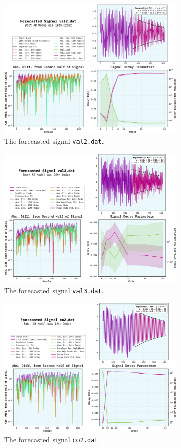 \documentclass[10pt, titlepage, a4paper]{article}
\begin{document}
\begin{figure}[H]
    \centering
    \includegraphics[width=0.8\textwidth]{../LinForecast/Images/forecast-val2.dat.pdf}
    \caption{The forecasted signal \texttt{val2.dat}.}
    \label{fig:forecast-1}
\end{figure}

\begin{figure}[H]
    \centering
    \includegraphics[width=0.8\textwidth]{../LinForecast/Images/forecast-val3.dat.pdf}
    \caption{The forecasted signal \texttt{val3.dat}.}
    \label{fig:forecast-2}
\end{figure}

\begin{figure}[H]
    \centering
    \includegraphics[width=0.8\textwidth]{../LinForecast/Images/forecast-co2.dat.pdf}
    \caption{The forecasted signal \texttt{co2.dat}.}
    \label{fig:forecast-3}
\end{figure}
\end{document}
